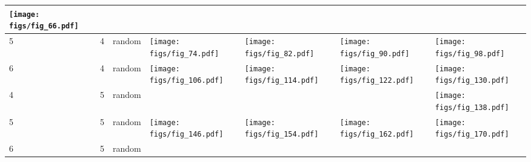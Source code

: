 \documentclass[oneside,canadian,landscape]{article}
\begin{document}
\begin{center}
\begin{longtable}{|l|l|l||l|l|l|l|}
\begin{minipage}{3.5cm}
\texttt{[image: figs/fig\_66.pdf]}
\end{minipage}
&\\ \hline
5&4&random&\begin{minipage}{3.5cm}
\texttt{[image: figs/fig\_74.pdf]}
\end{minipage}
&\begin{minipage}{3.5cm}
\texttt{[image: figs/fig\_82.pdf]}
\end{minipage}
&\begin{minipage}{3.5cm}
\texttt{[image: figs/fig\_90.pdf]}
\end{minipage}
&\begin{minipage}{3.5cm}
\texttt{[image: figs/fig\_98.pdf]}
\end{minipage}
\\ \hline
6&4&random&\begin{minipage}{3.5cm}
\texttt{[image: figs/fig\_106.pdf]}
\end{minipage}
&\begin{minipage}{3.5cm}
\texttt{[image: figs/fig\_114.pdf]}
\end{minipage}
&\begin{minipage}{3.5cm}
\texttt{[image: figs/fig\_122.pdf]}
\end{minipage}
&\begin{minipage}{3.5cm}
\texttt{[image: figs/fig\_130.pdf]}
\end{minipage}
\\ \hline
4&5&random&&&&\begin{minipage}{3.5cm}
\texttt{[image: figs/fig\_138.pdf]}
\end{minipage}
\\ \hline
5&5&random&\begin{minipage}{3.5cm}
\texttt{[image: figs/fig\_146.pdf]}
\end{minipage}
&\begin{minipage}{3.5cm}
\texttt{[image: figs/fig\_154.pdf]}
\end{minipage}
&\begin{minipage}{3.5cm}
\texttt{[image: figs/fig\_162.pdf]}
\end{minipage}
&\begin{minipage}{3.5cm}
\texttt{[image: figs/fig\_170.pdf]}
\end{minipage}
\\ \hline
6&5&random&&\begin{minipage}{3.5cm}

\end{minipage}
\end{longtable}
\end{center}
\end{document}
